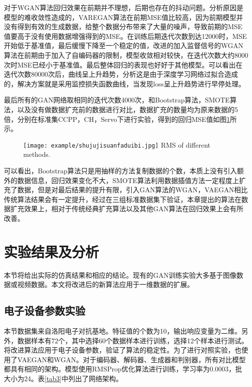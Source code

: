 对于WGAN算法回归效果在前期并不理想，后期也存在的抖动问题。分析原因是模型的难收敛性造成的，VAREGAN算法在前期MSE值比较高，因为前期模型并没有得到有效的生成数据，给整个数据分布带来了大量的噪声，导致前期的MSE值要高于没有使用数据增强得到的MSE。在训练后期迭代次数到达12000时，MSE开始低于基准值，最后缓慢下降至一个稳定的值，改进的加入监督信号的WGAN算法在前期由于加入了自编码器的限制，模型收敛相对较快，在迭代次数大约8000次时MSE已经小于基准值。最后整体回归的表现也好好于其他模型。可以看出在迭代次数80000次后，曲线呈上升趋势，分析这是由于深度学习网络过拟合造成的，解决方案就是采用监控损失函数曲线，当发现loss呈上升趋势进行早停处理。

最后所有的GAN网络取相同的迭代次数4000次，和Bootstrap算法，SMOTE算法，以及没有做数据扩充前的数据进行对比，数据扩充的数量均为原来数据的5倍，分别在标准集CCPP，CH，Servo下进行实验，得到的回归MSE值如图\ref{fig:MSE}所示。

\begin{figure}[htpb]
	\centering
	\texttt{[image: example/shujujisuanfaduibi.jpg]}
	{RMS of different methods.}
	\label{fig:MSE}
\end{figure}

可以看出，Bootstrap算法只是用抽样的方法复制数据的个数，本质上没有引入额外的数据信息，回归效果变化不大，SMOTE算法利用数据插值方法一定程度上扩充了数据，但是对最后结果的提升有限，引入GAN算法的WGAN，VAEGAN相比传统算法结果会有一定提升，经过在三组标准数据集下验证，本章提出的算法在数据扩充效果上，相对于传统经典扩充算法以及其他GAN算法在回归效果上会有所改善。


\section{实验结果及分析}
本节将给出实际的仿真结果和相应的结论。现有的GAN训练实验大多基于图像数据或视频数据。本文将改进后的新算法应用于一维数据的扩展。

\subsection{电子设备参数实验}

本节数据集来自洛阳电子对抗基地。特征值的个数为10，输出响应变量为二维。另外，数据样本有72个，其中选择60个数据样本进行训练，选择12个样本进行测试。将改进算法应用于电子设备参数，验证了算法的稳定性。为了进行对照实验，也使用了VAEGAN和WGAN。对于编码器、解码器、生成器和判别器，所有对比模型都具有相同的架构。模型使用RMSProp优化算法进行训练，学习率为0.0003，批大小为24。表\ref{tab3}中列出了网络架构。

